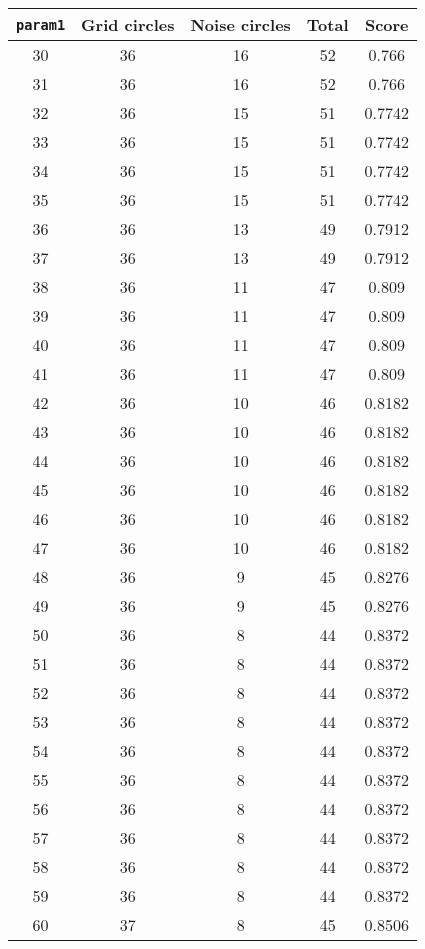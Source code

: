 \documentclass[letterpaper, 12pt]{article}
\begin{document}
\begin{longtable}{|c|c|c|c|c|}
\hline
\textbf{\texttt{param1}} & \textbf{Grid circles} & \textbf{Noise circles} & \textbf{Total} & \textbf{Score} \\
\hline
30 & 36 & 16 & 52 & 0.766 \\
\hline
31 & 36 & 16 & 52 & 0.766 \\
\hline
32 & 36 & 15 & 51 & 0.7742 \\
\hline
33 & 36 & 15 & 51 & 0.7742 \\
\hline
34 & 36 & 15 & 51 & 0.7742 \\
\hline
35 & 36 & 15 & 51 & 0.7742 \\
\hline
36 & 36 & 13 & 49 & 0.7912 \\
\hline
37 & 36 & 13 & 49 & 0.7912 \\
\hline
38 & 36 & 11 & 47 & 0.809 \\
\hline
39 & 36 & 11 & 47 & 0.809 \\
\hline
40 & 36 & 11 & 47 & 0.809 \\
\hline
41 & 36 & 11 & 47 & 0.809 \\
\hline
42 & 36 & 10 & 46 & 0.8182 \\
\hline
43 & 36 & 10 & 46 & 0.8182 \\
\hline
44 & 36 & 10 & 46 & 0.8182 \\
\hline
45 & 36 & 10 & 46 & 0.8182 \\
\hline
46 & 36 & 10 & 46 & 0.8182 \\
\hline
47 & 36 & 10 & 46 & 0.8182 \\
\hline
48 & 36 & 9 & 45 & 0.8276 \\
\hline
49 & 36 & 9 & 45 & 0.8276 \\
\hline
50 & 36 & 8 & 44 & 0.8372 \\
\hline
51 & 36 & 8 & 44 & 0.8372 \\
\hline
52 & 36 & 8 & 44 & 0.8372 \\
\hline
53 & 36 & 8 & 44 & 0.8372 \\
\hline
54 & 36 & 8 & 44 & 0.8372 \\
\hline
55 & 36 & 8 & 44 & 0.8372 \\
\hline
56 & 36 & 8 & 44 & 0.8372 \\
\hline
57 & 36 & 8 & 44 & 0.8372 \\
\hline
58 & 36 & 8 & 44 & 0.8372 \\
\hline
59 & 36 & 8 & 44 & 0.8372 \\
\hline
60 & 37 & 8 & 45 & 0.8506 \\
\hline

\end{longtable}
\end{document}

